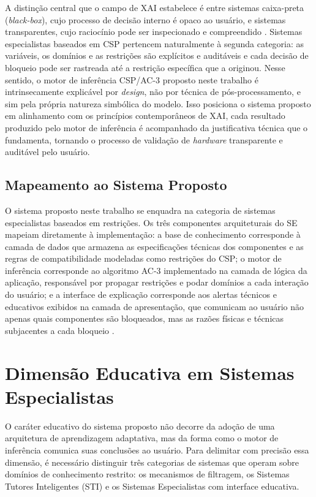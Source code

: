A distinção central que o campo de XAI estabelece é entre sistemas caixa-preta (\textit{black-box}), cujo processo
de decisão interno é opaco ao usuário, e sistemas transparentes, cujo raciocínio pode ser inspecionado e compreendido \cite{Arrieta2020}.
Sistemas especialistas baseados em CSP pertencem naturalmente à segunda categoria: as variáveis, os domínios e as restrições
são explícitos e auditáveis e cada decisão de bloqueio pode ser rastreada até a restrição específica que a originou.
Nesse sentido, o motor de inferência CSP/AC-3 proposto neste trabalho é intrinsecamente explicável por \textit{design}, não por
técnica de pós-processamento, e sim pela própria natureza simbólica do modelo. Isso posiciona o sistema proposto em alinhamento com
os princípios contemporâneos de XAI, cada resultado produzido pelo motor de inferência é acompanhado da justificativa técnica
que o fundamenta, tornando o processo de validação de \textit{hardware} transparente e auditável pelo usuário.

\subsection{Mapeamento ao Sistema Proposto}
O sistema proposto neste trabalho se enquadra na categoria de sistemas especialistas baseados em restrições.
Os três componentes arquiteturais do SE mapeiam diretamente à implementação: a base de conhecimento corresponde
à camada de dados que armazena as especificações técnicas dos componentes e as regras de compatibilidade modeladas
como restrições do CSP; o motor de inferência corresponde ao algoritmo AC-3 implementado na camada de lógica da aplicação,
responsável por propagar restrições e podar domínios a cada interação do usuário; e a interface de explicação corresponde
aos alertas técnicos e educativos exibidos na camada de apresentação, que comunicam ao usuário não apenas quais componentes
são bloqueados, mas as razões físicas e técnicas subjacentes a cada bloqueio \cite{Todd1992}.

\section{Dimensão Educativa em Sistemas Especialistas}
\label{sec:dimensao-educativa}
O caráter educativo do sistema proposto não decorre da adoção de uma arquitetura de aprendizagem  adaptativa,
mas da forma como o motor de inferência comunica suas conclusões ao usuário. Para delimitar com precisão
essa dimensão, é necessário distinguir três categorias de sistemas que operam sobre domínios de conhecimento restrito:
os mecanismos de filtragem, os Sistemas Tutores Inteligentes (STI) e os Sistemas Especialistas com interface educativa.



